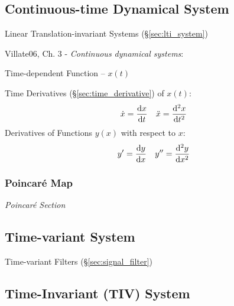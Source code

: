 \subsection{Continuous-time Dynamical System}
\label{sec:continuous_dynamical_system}

\fist Linear Translation-invariant Systems (\S\ref{sec:lti_system})

Villate06, Ch. 3 - \emph{Continuous dynamical systems}:

Time-dependent Function -- $x(t)$

Time Derivatives (\S\ref{sec:time_derivative}) of $x(t)$:
\begin{align*}
  \dot{x} &= \frac{\mathrm{d}x}{\mathrm{d}t} & \ddot{x} &= \frac{\mathrm{d}^2x}{\mathrm{d}t^2} \\
\end{align*}
Derivatives of Functions $y(x)$ with respect to $x$:
\begin{align*}
  y' &= \frac{\mathrm{d}y}{\mathrm{d}x} & y'' &= \frac{\mathrm{d}^2y}{\mathrm{d}x^2} \\
\end{align*}



\subsubsection{Poincar\'e Map}\label{sec:poincare_map}

\emph{Poincar\'e Section}



\subsection{Time-variant System}\label{sec:time_variant_system}

\fist Time-variant Filters (\S\ref{sec:signal_filter})



\subsection{Time-Invariant (TIV) System}\label{sec:tiv_system}

